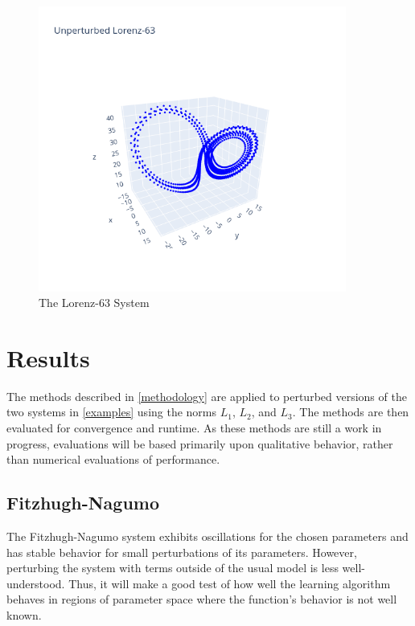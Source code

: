 \documentclass[12pt]{article}
\begin{document}
\begin{figure}[ht]
  \centering
  \includegraphics[width=0.9\textwidth]{lorenz-unperturbed.png}
  \caption{The Lorenz-63 System}
\end{figure}




\section{Results}

The methods described in \ref{methodology} are applied to perturbed versions of the two systems in \ref{examples} using the norms $L_1$, $L_2$, and $L_3$. The methods are then evaluated for convergence and runtime. As these methods are still a work in progress, evaluations will be based primarily upon qualitative behavior, rather than numerical evaluations of performance.


\subsection{Fitzhugh-Nagumo}

The Fitzhugh-Nagumo system exhibits oscillations for the chosen parameters and has stable behavior for small perturbations of its parameters.\cite{ramsay} However, perturbing the system with terms outside of the usual model is less well-understood. Thus, it will make a good test of how well the learning algorithm behaves in regions of parameter space where the function's behavior is not well known.
\end{document}
